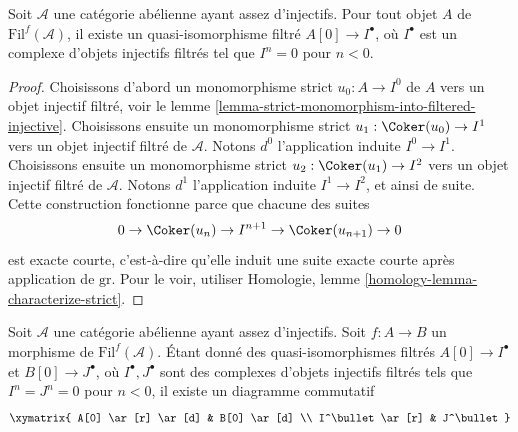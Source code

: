 \begin{lemma}
\label{lemma-filtered-injective-right-resolution-single-object}
Soit $\mathcal{A}$ une catégorie abélienne ayant assez d'injectifs.
Pour tout objet $A$ de $\text{Fil}^f(\mathcal{A})$, il existe un
quasi-isomorphisme filtré $A[0] \to I^\bullet$, où $I^\bullet$ est un complexe
d'objets injectifs filtrés tel que $I^n = 0$ pour $n < 0$.
\end{lemma}

\begin{proof}
Choisissons d'abord un monomorphisme strict
$u_0 : A \to I^0$ de $A$ vers un objet injectif filtré, voir le
lemme \ref{lemma-strict-monomorphism-into-filtered-injective}.
Choisissons ensuite un monomorphisme strict
$u_1 : \Coker(u_0) \to I^1$ vers un objet injectif filtré de
$\mathcal{A}$. Notons $d^0$ l'application induite
$I^0 \to I^1$.
Choisissons ensuite un monomorphisme strict
$u_2 : \Coker(u_1) \to I^2$ vers un objet injectif filtré de
$\mathcal{A}$. Notons $d^1$ l'application induite
$I^1 \to I^2$, et ainsi de suite. Cette construction fonctionne parce que
chacune des suites
$$
0 \to \Coker(u_n) \to I^{n + 1} \to \Coker(u_{n + 1}) \to 0
$$
est exacte courte, c'est-à-dire qu'elle induit une suite exacte courte après
application de $\text{gr}$. Pour le voir, utiliser Homologie, lemme
\ref{homology-lemma-characterize-strict}.
\end{proof}

\begin{lemma}
\label{lemma-filtered-injective-right-resolution-map}
Soit $\mathcal{A}$ une catégorie abélienne ayant assez d'injectifs.
Soit $f : A \to B$ un morphisme de $\text{Fil}^f(\mathcal{A})$.
Étant donné des quasi-isomorphismes filtrés
$A[0] \to I^\bullet$ et $B[0] \to J^\bullet$, où
$I^\bullet, J^\bullet$ sont des complexes d'objets injectifs filtrés tels que
$I^n = J^n = 0$ pour $n < 0$, il existe un diagramme commutatif
$$
\xymatrix{
A[0] \ar[r] \ar[d] &
B[0] \ar[d] \\
I^\bullet \ar[r] &
J^\bullet
}
$$
\end{lemma}

